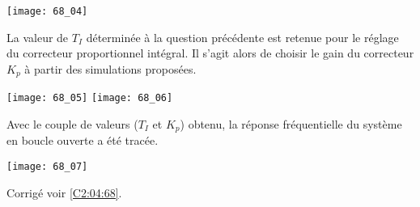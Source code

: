\begin{center}
\texttt{[image: 68\_04]}
\end{center}
\fi

\ifprof
\else 
\fi


\ifprof
\else 
La valeur de $T_I$ déterminée à la question précédente est retenue pour le réglage du correcteur proportionnel intégral.
Il s’agit alors de choisir le gain du correcteur $K_p$ à partir des simulations proposées.

\begin{center}
\texttt{[image: 68\_05]}
\texttt{[image: 68\_06]}
\end{center}
\fi

\ifprof
\else 
\fi

\ifprof
\else 

Avec le couple de valeurs ($T_I$ et $K_p$) obtenu, la réponse fréquentielle du système en boucle ouverte a été tracée.
\begin{center}
\texttt{[image: 68\_07]}
\end{center}
\fi


\ifprof
\else 
\fi


\ifprof
\else

\noindent\footnotesize
\normalsize

\begin{flushright}
\footnotesize{Corrigé  voir \ref{C2:04:68}.}
\end{flushright}%
\fi